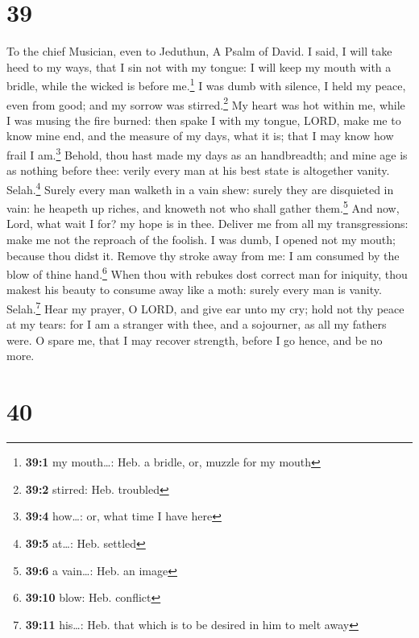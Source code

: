 \hypertarget{section-38}{%
\section{39}\label{section-38}}

To the chief Musician, even to Jeduthun, A Psalm of David.
 I said, I will take heed to my ways, that I sin not with
my tongue: I will keep my mouth with a bridle, while the wicked is
before me.\footnote{\textbf{39:1} my mouth\ldots: Heb. a bridle, or,
  muzzle for my mouth}  I was dumb with silence, I held my
peace, even from good; and my sorrow was stirred.\footnote{\textbf{39:2}
  stirred: Heb. troubled}  My heart was hot within me,
while I was musing the fire burned: then spake I with my tongue,
 LORD, make me to know mine end, and the measure of my
days, what it is; that I may know how frail I am.\footnote{\textbf{39:4}
  how\ldots: or, what time I have here}  Behold, thou hast
made my days as an handbreadth; and mine age is as nothing before thee:
verily every man at his best state is altogether vanity.
Selah.\footnote{\textbf{39:5} at\ldots: Heb. settled} 
Surely every man walketh in a vain shew: surely they are disquieted in
vain: he heapeth up riches, and knoweth not who shall gather
them.\footnote{\textbf{39:6} a vain\ldots: Heb. an image} 
And now, Lord, what wait I for? my hope is in thee. 
Deliver me from all my transgressions: make me not the reproach of the
foolish.  I was dumb, I opened not my mouth; because thou
didst it.  Remove thy stroke away from me: I am consumed
by the blow of thine hand.\footnote{\textbf{39:10} blow: Heb. conflict}
 When thou with rebukes dost correct man for iniquity,
thou makest his beauty to consume away like a moth: surely every man is
vanity. Selah.\footnote{\textbf{39:11} his\ldots: Heb. that which is to
  be desired in him to melt away}  Hear my prayer, O
LORD, and give ear unto my cry; hold not thy peace at my tears: for I am
a stranger with thee, and a sojourner, as all my fathers were.
 O spare me, that I may recover strength, before I go
hence, and be no more.

\hypertarget{section-39}{%
\section{40}\label{section-39}}

